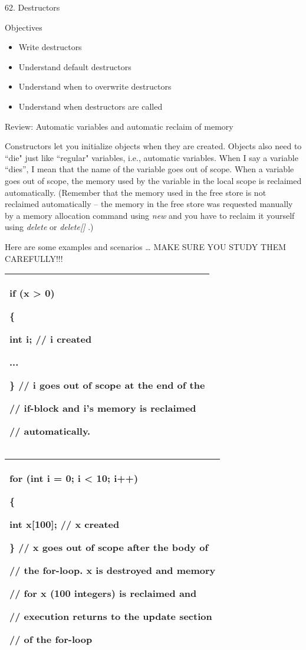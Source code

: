 \documentclass[
]{article}
\author{}
\date{}
\providecommand{\tightlist}{%
  \setlength{\itemsep}{0pt}\setlength{\parskip}{0pt}}
\begin{document}
62. Destructors

Objectives

\begin{itemize}
\tightlist
\item
  Write destructors
\item
  Understand default destructors
\item
  Understand when to overwrite destructors
\item
  Understand when destructors are called
\end{itemize}

Review: Automatic variables and automatic reclaim of memory

Constructors let you initialize objects when they are created. Objects
also need to ``die" just like ``regular" variables, i.e., automatic
variables. When I say a variable ``dies'', I mean that the name of the
variable goes out of scope. When a variable goes out of scope, the
memory used by the variable in the local scope is reclaimed
automatically. (Remember that the memory used in the free store is not
reclaimed automatically -- the memory in the free store was requested
manually by a memory allocation command using \emph{new} and you have to
reclaim it yourself using \emph{delete} or \emph{delete{[}{]}} .)

Here are some examples and scenarios \ldots{} MAKE SURE YOU STUDY THEM
CAREFULLY!!!

\begin{longtable}[]{@{}l@{}}
\toprule
\endhead
\begin{minipage}[t]{0.97\columnwidth}\raggedright
if (x \textgreater{} 0)

\{

int i; // i created

...

\} // i goes out of scope at the end of the

// if-block and i's memory is reclaimed

// automatically.\strut
\end{minipage}\tabularnewline
\bottomrule
\end{longtable}

\begin{longtable}[]{@{}l@{}}
\toprule
\endhead
\begin{minipage}[t]{0.97\columnwidth}\raggedright
for (int i = 0; i \textless{} 10; i++)

\{

int x{[}100{]}; // x created

\} // x goes out of scope after the body of

// the for-loop. x is destroyed and memory

// for x (100 integers) is reclaimed and

// execution returns to the update section

// of the for-loop\strut
\end{minipage}\tabularnewline
\bottomrule
\end{longtable}
\end{document}
